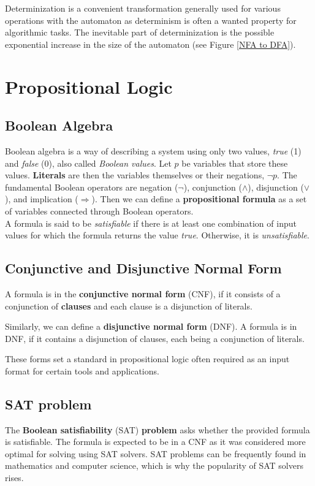 Determinization is a convenient transformation generally used for various operations with the automaton as determinism is often a wanted property for algorithmic tasks. The inevitable part of determinization is the possible exponential increase in the size of the automaton (see Figure \ref{NFA to DFA}).

\section{Propositional Logic}
\label{sec:prop_logic}

\subsection*{Boolean Algebra}
Boolean algebra is a way of describing a system using only two values, \textit{true} (1) and \textit{false} (0), also called \textit{Boolean values}. Let $p$ be variables that store these values. \textbf{Literals} are then the variables themselves or their negations, $\neg p$. The fundamental  Boolean operators are negation ($\neg$), conjunction ($\land$), disjunction ($\lor$), and implication ($ \Rightarrow$). Then we can define a \textbf{propositional formula} as a set of variables connected through Boolean operators. \\

A formula is said to be \textit{satisfiable} if there is at least one combination of input values for which the formula returns the value \textit{true}. Otherwise, it is \textit{unsatisfiable}.

\subsection*{Conjunctive and Disjunctive Normal Form}
A formula is in the \textbf{conjunctive normal form} (CNF), if it consists of a conjunction of \textbf{clauses} and each clause is a disjunction of literals.

Similarly, we can define a \textbf{disjunctive normal form} (DNF). A formula is in DNF, if it contains a disjunction of clauses, each being a conjunction of literals.

These forms set a standard in propositional logic often required as an input format for certain tools and applications.

\subsection*{SAT problem}
The \textbf{Boolean satisfiability} (SAT) \textbf{problem} asks whether the provided formula is satisfiable. The formula is expected to be in a CNF as it was considered more optimal for solving using SAT solvers. SAT problems can be frequently found in mathematics and computer science, which is why the popularity of SAT solvers rises. 
